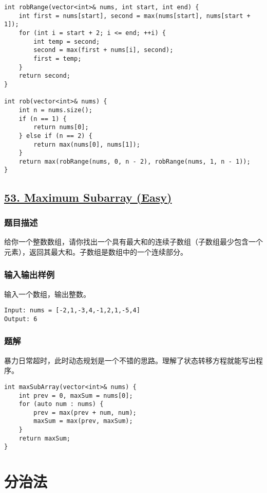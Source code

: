 \documentclass[lang=cn,10pt]{elegantbook}
\begin{document}
\begin{lstlisting}
int robRange(vector<int>& nums, int start, int end) {
	int first = nums[start], second = max(nums[start], nums[start + 1]);
	for (int i = start + 2; i <= end; ++i) {
		int temp = second;
		second = max(first + nums[i], second);
		first = temp;
	}
	return second;
}

int rob(vector<int>& nums) {
	int n = nums.size();
	if (n == 1) {
		return nums[0];
	} else if (n == 2) {
		return max(nums[0], nums[1]);
	}
	return max(robRange(nums, 0, n - 2), robRange(nums, 1, n - 1));
}
\end{lstlisting}

{\color{red}\section{\href{https://leetcode.cn/problems/maximum-subarray/}{53. Maximum Subarray (Easy)}}} \label{ch7.53}

\subsection*{题目描述}

给你一个整数数组，请你找出一个具有最大和的连续子数组（子数组最少包含一个元素），返回其最大和。子数组是数组中的一个连续部分。

\subsection*{输入输出样例}

输入一个数组，输出整数。

\begin{lstlisting}
Input: nums = [-2,1,-3,4,-1,2,1,-5,4]
Output: 6
\end{lstlisting}

\subsection*{题解}

暴力日常超时，此时动态规划是一个不错的思路。理解了状态转移方程就能写出程序。

\begin{lstlisting}
int maxSubArray(vector<int>& nums) {
	int prev = 0, maxSum = nums[0];
	for (auto num : nums) {
		prev = max(prev + num, num);
		maxSum = max(prev, maxSum);
	}
	return maxSum;
}
\end{lstlisting}

\chapter{分治法}
\end{document}
